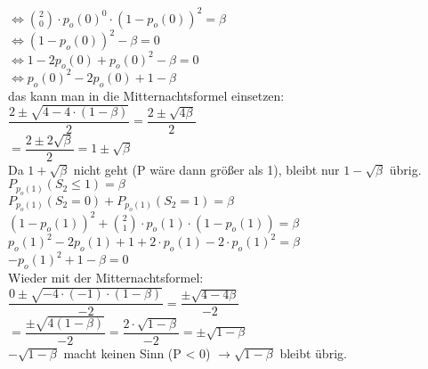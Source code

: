 \documentclass{article}
\begin{document}
				$\Leftrightarrow \binom{2}{0} \cdot p_o(0)^0 \cdot (1-p_o(0))^2 = \beta$\\[1.1em]
				
				$\Leftrightarrow (1-p_o(0))^2 - \beta = 0$\\[1.1em]
				
				$\Leftrightarrow 1 - 2p_o(0) + p_o(0)^2 - \beta = 0$\\[1.1em]
				
				$\Leftrightarrow p_o(0)^2 - 2p_o(0) + 1 - \beta$\\[1.1em]
				
				das kann man in die Mitternachtsformel einsetzen:\\[1.1em]
				
				$\dfrac{2 \pm \sqrt{4 - 4 \cdot (1 - \beta)}}{2} = \dfrac{2 \pm \sqrt{4\beta}}{2}$\\[1.1em]
				
				$= \dfrac{2 \pm 2\sqrt{\beta}}{2} = 1 \pm \sqrt{\beta}$\\ 
				Da $1 + \sqrt{\beta}$ nicht geht (P wäre dann größer als 1), bleibt nur $1 - \sqrt{\beta}$ übrig.\\[2em]
				
				
				$P_{p_o(1)}(S_2 \leq 1) = \beta$\\[1.1em]
				
				$P_{p_o(1)}(S_2 = 0) + P_{p_o(1)}(S_2 = 1) = \beta$\\[1.1em]
				
				$(1 - p_o(1))^2 + \binom{2}{1} \cdot p_o(1) \cdot (1 - p_o(1)) = \beta$\\[1.1em]
				
				$p_o(1)^2 - 2p_o(1) + 1 + 2\cdot p_o(1) - 2\cdot p_o(1)^2 = \beta$\\[1.1em]
				
				$-p_o(1)^2 + 1 - \beta = 0$\\[1.1em]
				
				Wieder mit der Mitternachtsformel:\\[1.1em]
				
				$\dfrac{0 \pm\sqrt{-4 \cdot (-1) \cdot (1-\beta)}}{-2} =\dfrac{\pm \sqrt{4-4\beta}}{-2}$\\[1.1em]
				
				$= \dfrac{\pm \sqrt{4(1-\beta)}}{-2} = \dfrac{2 \cdot \sqrt{1 - \beta}}{-2} = \pm \sqrt{1-\beta}$\\
				$-\sqrt{1-\beta}$ macht keinen Sinn (P < 0) $\rightarrow \sqrt{1-\beta}$ bleibt übrig.\\[2em]
				
\end{document}
